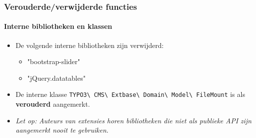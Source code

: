 \begin{frame}[fragile]
	\frametitle{Verouderde/verwijderde functies}
	\framesubtitle{Interne bibliotheken en klassen}

	\begin{itemize}
		\item De volgende interne bibliotheken zijn verwijderd:
			\begin{itemize}
				\item "bootstrap-slider"
				\item "jQuery.datatables"
			\end{itemize}
			\vspace{0.4cm}

		\item De interne klasse \small\texttt{TYPO3\textbackslash
			CMS\textbackslash
			Extbase\textbackslash
			Domain\textbackslash
			Model\textbackslash
			FileMount}\normalsize\newline
			is als \textbf{verouderd} aangemerkt.

	\end{itemize}

	\vspace{0.6cm}
	\begin{itemize}
		\item[\ding{228}] \textit{Let op:} \textit{Auteurs van extensies horen bibliotheken die niet als publieke API zijn aangemerkt nooit te gebruiken.}
	\end{itemize}

\end{frame}


